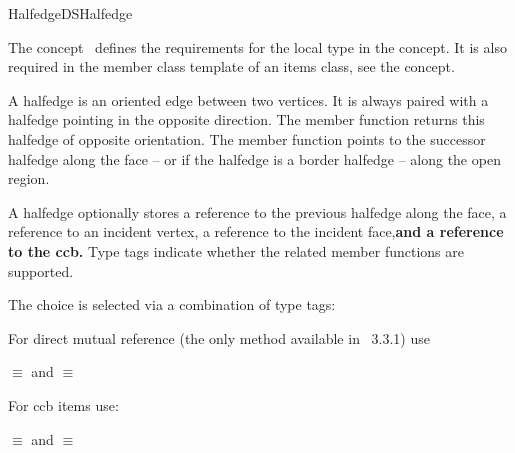 
\ccRefPageBegin



\begin{ccRefConcept}{HalfedgeDSHalfedge}
\label{pageHalfedgeDSItemsHalfedgeRef}

\ccDefinition
  
The concept \ccRefName\ defines the requirements for the local  
type in the  concept. It is also required in 
the  member class template of an
items class, see the  concept.

A halfedge is an oriented edge between two vertices. It is always
paired with a halfedge pointing in the opposite direction. The
 member function returns this halfedge of opposite
orientation. The  member function points to the successor
halfedge along the face -- or if the halfedge is a border halfedge --
along the open region. 



A halfedge optionally stores a reference to the
previous halfedge along the face, a reference to an incident vertex,
a reference to the incident face,{\bf\ttfamily and a reference to the ccb.}
Type tags indicate whether the related member functions are supported.

{\bf\ttfamily



The choice is selected via a combination of type tags:

For direct mutual reference (the only method available in \cgal\ 3.3.1) use

 $\equiv$  
and
 $\equiv$  

For ccb items use:

 $\equiv$  
and
 $\equiv$  
 
}
\end{ccRefConcept}

